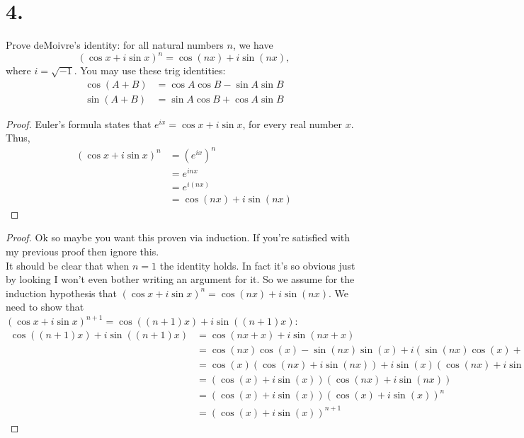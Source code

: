 \documentclass[]{article}
\begin{document}
\section*{4.}
Prove deMoivre's identity: for all natural numbers $n$, we have
$$
\left(\cos x + i\sin x\right)^n = \cos(nx) + i\sin(nx),
$$
where $i = \sqrt{-1}$. You may use these trig identities:
\begin{align*}
	\cos(A + B) &= \cos A \cos B - \sin A \sin B \\
	\sin(A + B) &= \sin A \cos B + \cos A \sin B
\end{align*}
\begin{proof}
	Euler's formula states that $e^{ix} = \cos x + i \sin x$, for every real number $x$. Thus,
	\begin{align*}
		(\cos x + i\sin x)^n &= \left(e^{ix}\right)^n \\
		&= e^{inx} \\
		&= e^{i(nx)} \\
		&= \cos(nx) + i\sin(nx)
	\end{align*}
\end{proof}
\begin{proof}
	Ok so maybe you want this proven via induction. If you're satisfied with my previous proof then ignore this.\\
	It should be clear that when $n = 1$ the identity holds. In fact it's so obvious just by looking I won't even bother writing an argument for it. So we assume for the induction hypothesis that $\left(\cos x + i\sin x\right)^n = \cos(nx) + i\sin(nx)$. We need to show that $\left(\cos x + i\sin x\right)^{n + 1} = \cos((n + 1)x) + i\sin((n + 1)x)$:
	\begin{align*}
		\cos((n + 1)x) + i\sin((n + 1)x) &= \cos(nx + x) + i\sin(nx + x) \\
		&= \cos(nx)\cos(x) - \sin(nx)\sin(x) + i(\sin(nx)\cos(x) + \cos(nx)\sin(x))\\
		&= \cos(x)\left(\cos(nx) + i\sin(nx)\right) + i\sin(x)(\cos(nx) + i\sin(nx)) \\
		&= \left(\cos(x) + i\sin(x)\right)\left(\cos(nx) + i\sin(nx)\right) \\
		&= \left(\cos(x) + i\sin(x)\right)\left(\cos(x) + i\sin(x)\right)^n \\
		&= \left(\cos(x) + i\sin(x)\right)^{n + 1}
	\end{align*}
\end{proof}
\end{document}
